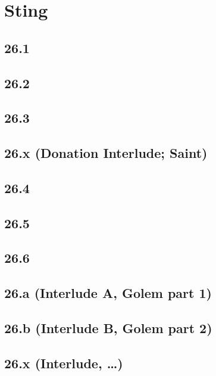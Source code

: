 \part{Sting}
 \chapter{26.1}
 \chapter{26.2}
 \chapter{26.3}
 \chapter{26.x (Donation Interlude; Saint)}
 \chapter{26.4}
 \chapter{26.5}
 \chapter{26.6}
 \chapter{26.a (Interlude A, Golem part 1)}
 \chapter{26.b (Interlude B, Golem part 2)}
 \chapter{26.x (Interlude, …)}











